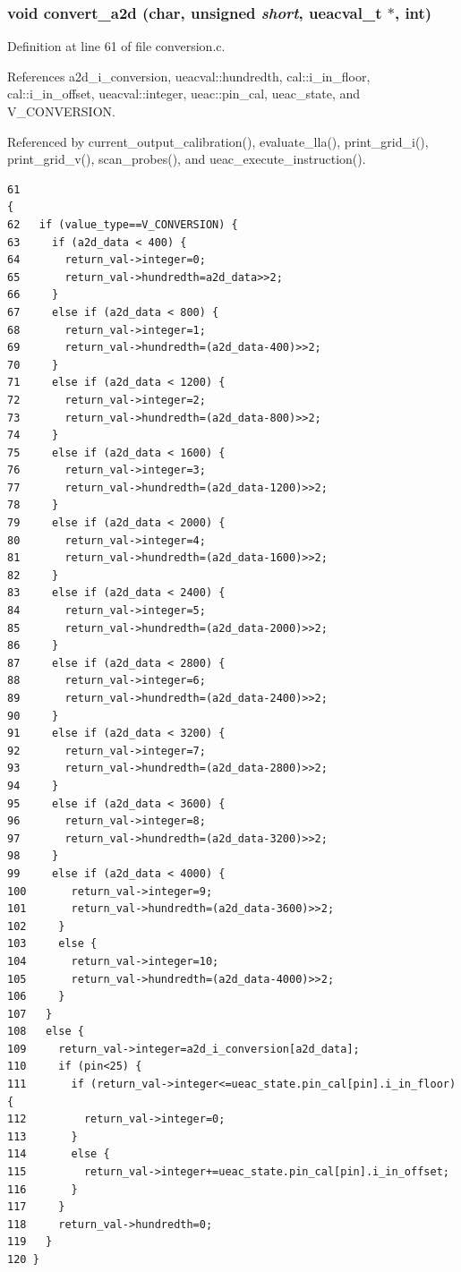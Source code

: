 \subsubsection{\setlength{\rightskip}{0pt plus 5cm}void convert\_\-a2d (char, unsigned {\em short}, {\bf ueacval\_\-t} $\ast$, int)}\label{conversion_8h_a3}




Definition at line 61 of file conversion.c.

References a2d\_\-i\_\-conversion, ueacval::hundredth, cal::i\_\-in\_\-floor, cal::i\_\-in\_\-offset, ueacval::integer, ueac::pin\_\-cal, ueac\_\-state, and V\_\-CONVERSION.

Referenced by current\_\-output\_\-calibration(), evaluate\_\-lla(), print\_\-grid\_\-i(), print\_\-grid\_\-v(), scan\_\-probes(), and ueac\_\-execute\_\-instruction().

\footnotesize\begin{verbatim}61                                                                                         {
62   if (value_type==V_CONVERSION) {
63     if (a2d_data < 400) {
64       return_val->integer=0;
65       return_val->hundredth=a2d_data>>2;
66     }
67     else if (a2d_data < 800) {
68       return_val->integer=1;
69       return_val->hundredth=(a2d_data-400)>>2;
70     }
71     else if (a2d_data < 1200) {
72       return_val->integer=2;
73       return_val->hundredth=(a2d_data-800)>>2;
74     }
75     else if (a2d_data < 1600) {
76       return_val->integer=3;
77       return_val->hundredth=(a2d_data-1200)>>2;
78     }
79     else if (a2d_data < 2000) {
80       return_val->integer=4;
81       return_val->hundredth=(a2d_data-1600)>>2;
82     }
83     else if (a2d_data < 2400) {
84       return_val->integer=5;
85       return_val->hundredth=(a2d_data-2000)>>2;
86     }
87     else if (a2d_data < 2800) {
88       return_val->integer=6;
89       return_val->hundredth=(a2d_data-2400)>>2;
90     }
91     else if (a2d_data < 3200) {
92       return_val->integer=7;
93       return_val->hundredth=(a2d_data-2800)>>2;
94     }
95     else if (a2d_data < 3600) {
96       return_val->integer=8;
97       return_val->hundredth=(a2d_data-3200)>>2;
98     }
99     else if (a2d_data < 4000) {
100       return_val->integer=9;
101       return_val->hundredth=(a2d_data-3600)>>2;
102     }
103     else {
104       return_val->integer=10;
105       return_val->hundredth=(a2d_data-4000)>>2;
106     }
107   }
108   else {
109     return_val->integer=a2d_i_conversion[a2d_data];
110     if (pin<25) {
111       if (return_val->integer<=ueac_state.pin_cal[pin].i_in_floor) {
112         return_val->integer=0;
113       }
114       else {
115         return_val->integer+=ueac_state.pin_cal[pin].i_in_offset;
116       }
117     }
118     return_val->hundredth=0;
119   }
120 }
\end{verbatim}\normalsize 


